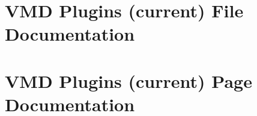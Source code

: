 \documentclass[a4paper]{book}
\begin{document}
\chapter{VMD Plugins (current) File Documentation}














































































\chapter{VMD Plugins (current) Page Documentation}







\printindex
\end{document}
